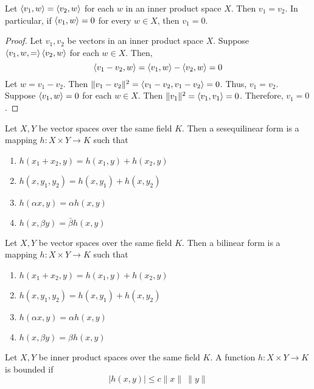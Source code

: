 \begin{lemma}[equality]
	Let $\left\langle v_1,w \right\rangle = \left\langle v_2,w \right\rangle$ for each $w$ in an inner product space $X$.
	Then $v_1 = v_2$.
	In particular, if $\left\langle v_1,w \right\rangle = 0$ for every $w \in X$, then $v_1 = 0$.
\end{lemma}
\begin{proof}
	Let $v_1,v_2$ be vectors in an inner product space $X$.
	Suppose $\left\langle v_1,w,= \right\rangle \left\langle v_2,w \right\rangle$ for each $w \in X$.
	Then,
	\[ \left\langle v_1-v_2,w \right\rangle = \left\langle v_1,w \right\rangle - \left\langle v_2,w \right\rangle = 0 \]
	Let $w= v_1-v_2$.
	Then $\|v_1-v_2\|^2 = \left\langle v_1-v_2,v_1-v_2 \right\rangle = 0$.
	Thus, $v_1 = v_2$.\\

	Suppose $\left\langle v_1,w \right\rangle = 0$ for each $w \in X$.
	Then $\|v_1\|^2 = \left\langle v_1,v_1 \right\rangle = 0$.
	Therefore, $v_1 = 0$.
\end{proof}

\begin{definition}
	Let $X,Y$ be vector spaces over the same field $K$.
	Then a sesequilinear form is a mapping $h : X \times Y \to K$ such that
	\begin{enumerate}
		\item $h(x_1+x_2,y) = h(x_1,y)+h(x_2,y)$
		\item $h(x,y_1,y_2) = h(x,y_1) + h(x,y_2)$
		\item $h(\alpha x,y) = \alpha h(x,y)$
		\item $h(x,\beta y) = \bar{\beta} h(x,y)$
	\end{enumerate}
\end{definition}

\begin{definition}
	Let $X,Y$ be vector spaces over the same field $K$.
	Then a bilinear form is a mapping $h : X \times Y \to K$ such that
	\begin{enumerate}
		\item $h(x_1+x_2,y) = h(x_1,y)+h(x_2,y)$
		\item $h(x,y_1,y_2) = h(x,y_1) + h(x,y_2)$
		\item $h(\alpha x,y) = \alpha h(x,y)$
		\item $h(x,\beta y) = \beta h(x,y)$
	\end{enumerate}
\end{definition}

\begin{definition}
	Let $X,Y$ be inner product spaces over the same field $K$.
	A function $h : X \times Y \to K$ is bounded if
	\[ |h(x,y)| \le c\|x\| \ \|y\| \]
\end{definition}

